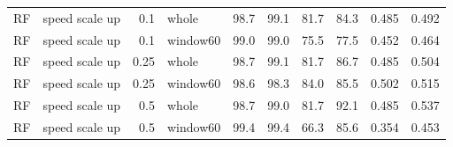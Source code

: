 \begin{longtable}{llrlrrrrrr}
RF & speed scale up & 0.1 & whole & 98.7 & 99.1 & 81.7 & 84.3 & 0.485 & 0.492 \\
RF & speed scale up & 0.1 & window60 & 99.0 & 99.0 & 75.5 & 77.5 & 0.452 & 0.464 \\
RF & speed scale up & 0.25 & whole & 98.7 & 99.1 & 81.7 & 86.7 & 0.485 & 0.504 \\
RF & speed scale up & 0.25 & window60 & 98.6 & 98.3 & 84.0 & 85.5 & 0.502 & 0.515 \\
RF & speed scale up & 0.5 & whole & 98.7 & 99.0 & 81.7 & 92.1 & 0.485 & 0.537 \\
RF & speed scale up & 0.5 & window60 & 99.4 & 99.4 & 66.3 & 85.6 & 0.354 & 0.453 \\
\bottomrule
\end{longtable}
